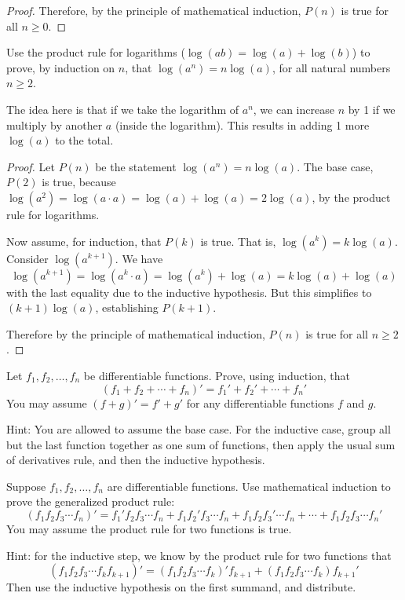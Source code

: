 \begin{questions}
\begin{answer}
\begin{proof}
			Therefore, by the principle of mathematical induction, $P(n)$ is true for all $n \ge 0$.
		\end{proof}
	\end{answer}
	
	
\question Use the product rule for logarithms ($\log(ab) = \log(a) + \log(b)$) to prove, by induction on $n$, that $\log(a^n) = n \log(a)$, for all natural numbers $n \ge 2$.

	\begin{answer}
		The idea here is that if we take the logarithm of $a^n$, we can increase $n$ by 1 if we multiply by another $a$ (inside the logarithm).  This results in adding 1 more $\log(a)$ to the total.
		
		\begin{proof}
			Let $P(n)$ be the statement $\log(a^n) = n \log(a)$.  The base case, $P(2)$ is true, because $\log(a^2) = \log(a\cdot a) = \log(a) + \log(a) = 2\log(a)$, by the product rule for logarithms.
			
			Now assume, for induction, that $P(k)$ is true.  That is, $\log(a^k) = k\log(a)$.  Consider $\log(a^{k+1})$.  We have
			\[\log(a^{k+1}) = \log(a^k\cdot a) = \log(a^k) + \log(a) = k\log(a) + \log(a)\]
			with the last equality due to the inductive hypothesis.  But this simplifies to $(k+1) \log(a)$, establishing $P(k+1)$.
			
			Therefore by the principle of mathematical induction, $P(n)$ is true for all $n \ge 2$.	
		\end{proof}
	\end{answer}
	
	
\question Let $f_1, f_2,\ldots, f_n$ be differentiable functions.  Prove, using induction, that
\[(f_1 + f_2 + \cdots + f_n)' = f_1' + f_2' + \cdots + f_n'\]
You may assume $(f+g)' = f' + g'$ for any differentiable functions $f$ and $g$.

	\begin{answer}
		Hint: You are allowed to assume the base case.  For the inductive case, group all but the last function together as one sum of functions, then apply the usual sum of derivatives rule, and then the inductive hypothesis.
	\end{answer}


\question Suppose $f_1, f_2, \ldots, f_n$ are differentiable functions.  Use mathematical induction to prove the generalized product rule: 
\[(f_1 f_2 f_3 \cdots f_n)' = f_1' f_2 f_3 \cdots f_n + f_1 f_2' f_3 \cdots f_n + f_1 f_2 f_3' \cdots f_n + \cdots + f_1 f_2 f_3 \cdots f_n'\]
You may assume the product rule for two functions is true.

	\begin{answer}
		Hint: for the inductive step, we know by the product rule for two functions that \[(f_1f_2f_3 \cdots f_k f_{k+1})' = (f_1f_2f_3\cdots f_k)'f_{k+1} + (f_1f_2f_3\cdots f_k)f_{k+1}'\]
		Then use the inductive hypothesis on the first summand, and distribute.
	\end{answer}


\end{questions}